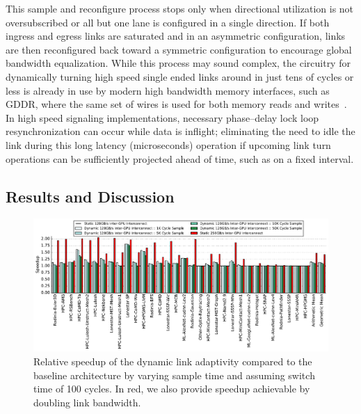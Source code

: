 This sample and 
reconfigure process stops only when directional utilization is not 
oversubscribed or all but one lane is configured in a single direction. 
If both ingress and egress links are saturated and in an asymmetric 
configuration, links are then reconfigured back toward a symmetric configuration 
to encourage global bandwidth equalization. While this process may sound 
complex, the circuitry for dynamically turning high speed single ended links 
around in just tens of cycles or less is already in use by modern high bandwidth 
memory interfaces, such as GDDR, where the same set of wires is used for both memory reads 
and writes~\cite{hynixgddr51Gb}. In high speed signaling implementations,
necessary phase--delay lock loop
resynchronization can occur while data is inflight; eliminating the need to idle
the link during this long latency (microseconds) operation if upcoming link turn operations
can be sufficiently projected ahead of time, such as on a fixed interval.

\subsection{Results and Discussion} 

\begin{figure}[tp]
	\centering
	\includegraphics[width=1.0\textwidth]{figures/plot_nvlink_sample_time.pdf}
	\caption{Relative speedup of the dynamic link adaptivity compared to
		the baseline architecture by varying sample time and assuming switch 
		time of
		100 cycles. In red, we also provide speedup achievable by doubling link 
		bandwidth.}
	\label{fig:sampletime}
	\vspace{-.1in}
\end{figure}

